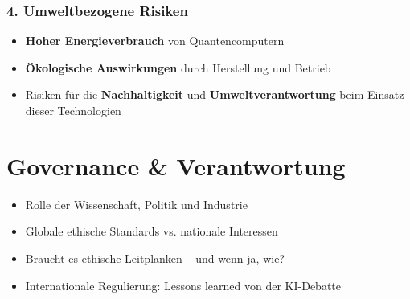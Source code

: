 \subsubsection{\textbf{4. Umweltbezogene Risiken}}
\begin{itemize}
    \item \textbf{Hoher Energieverbrauch} von Quantencomputern
    \item \textbf{Ökologische Auswirkungen} durch Herstellung und Betrieb
    \item Risiken für die \textbf{Nachhaltigkeit} und \textbf{Umweltverantwortung} beim Einsatz dieser Technologien
\end{itemize}

\cite{umbrello_quantum_2024}

\section{Governance \& Verantwortung}
\begin{itemize}
\item Rolle der Wissenschaft, Politik und Industrie
\item Globale ethische Standards vs. nationale Interessen
\item Braucht es ethische Leitplanken – und wenn ja, wie?
\item Internationale Regulierung: Lessons learned von der KI-Debatte
\end{itemize}


